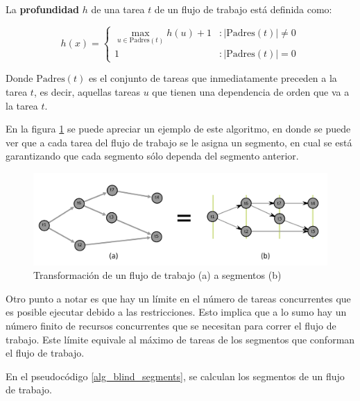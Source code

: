 \begin{defn}

La \textbf{profundidad} $h$ de una tarea $t$ de un flujo de trabajo está definida como:

\begin{displaymath}
h(x) = \left\{
     \begin{array}{lr}
       \max_{u \in \text{Padres}(t) } h(u) + 1 & : | \text{Padres}(t) | \neq 0 \\
       1                                       & : | \text{Padres}(t) | = 0
     \end{array}
   \right.
\end{displaymath}

\noindent Donde $\text{Padres}(t)$ es el conjunto de tareas que inmediatamente preceden a la tarea $t$, es decir, aquellas tareas $u$ que tienen una dependencia de orden que va a la tarea $t$.
\end{defn}

En la figura \ref{fig:DAG_to_segment} se puede apreciar un ejemplo de este algoritmo, en donde se puede ver que a cada tarea del flujo de trabajo se le asigna un segmento, en cual se está garantizando que cada segmento sólo dependa del segmento anterior.

\begin{figure}
\begin{center}
\includegraphics[width=1.0\textwidth]{imagenes/DAG_to_segment.pdf}
\end{center}
\caption{Transformación de un flujo de trabajo (a) a segmentos (b)}
\label{fig:DAG_to_segment}
\end{figure}

Otro punto a notar es que hay un límite en el número de tareas concurrentes que es posible ejecutar debido a las restricciones. Esto implica que a lo sumo hay un número finito de recursos concurrentes que se necesitan para correr el flujo de trabajo. Este límite equivale al máximo de tareas de los segmentos que conforman el flujo de trabajo.

En el pseudocódigo \ref{alg_blind_segments}, se calculan los segmentos de un flujo de trabajo.

